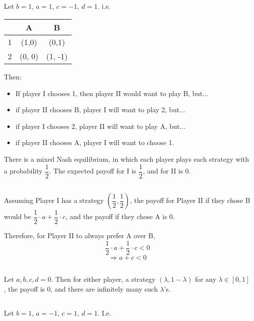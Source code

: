 \documentclass[11pt,journal]{article}
\begin{document}
	\subsection{}
	Let $b = 1$, $a = 1$, $c=-1$, $d=1$. i.e.
	\begin{table}[h]
		\centering
		\begin{tabular}{c|c|c}
			& A & B \\
			\hline
			1 &(1,0) & (0,1) \\
			\hline
			2 & (0, 0) & (1, -1) \\
		\end{tabular}
	\end{table}
	
	Then:
	
	\begin{itemize}
		\item If player I chooses 1, then player II would want to play B, but...
		\item if player II chooses B, player I will want to play 2, but...
		\item if player I chooses 2, player II will want to play A, but...
		\item if player II chooses A, player I will want to choose 1.
	\end{itemize}

	There is a mixed Nash equilibrium, in which each player plays each strategy with a probability $\dfrac{1}{2}$. The expected payoff for I is $\dfrac{1}{2}$, and for II is 0.
	
	\subsection{}
	Assuming Player I has a strategy $(\dfrac{1}{2}, \dfrac{1}{2})$, the payoff for Player II if they chose B would be $\dfrac{1}{2} \cdot a + \dfrac{1}{2} \cdot c$, and the payoff if they chose A is 0.
	
	Therefore, for Player II to always prefer A over B, \[\dfrac{1}{2} \cdot a + \dfrac{1}{2} \cdot c < 0\]
	\[\Rightarrow a+c <0\]
	
	\subsection{}
	Let $a,b,c,d = 0$. Then for either player, a strategy $(\lambda, 1-\lambda)$ for any $\lambda \in [0,1]$, the payoff is 0, and there are infinitely many such $\lambda$'s.
	
	\subsection{}
	Let $b = 1$, $a = -1$, $c=1$, $d=1$. I.e.
	
\end{document}
